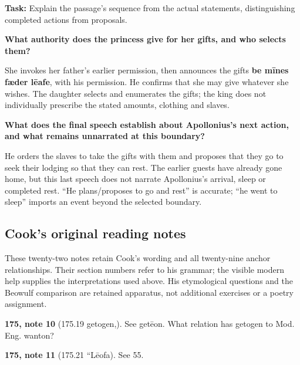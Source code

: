 \textbf{Task:} Explain the passage’s sequence from the actual statements, distinguishing completed actions from proposals.

\textbf{What authority does the princess give for her gifts, and who selects them?}

She invokes her father’s earlier permission, then announces the gifts \textbf{be mīnes fæder lēafe}, with his permission. He confirms that she may give whatever she wishes. The daughter selects and enumerates the gifts; the king does not individually prescribe the stated amounts, clothing and slaves.

\textbf{What does the final speech establish about Apollonius’s next action, and what remains unnarrated at this boundary?}

He orders the slaves to take the gifts with them and proposes that they go to seek their lodging so that they can rest. The earlier guests have already gone home, but this last speech does not narrate Apollonius’s arrival, sleep or completed rest. “He plans/\allowbreak{}proposes to go and rest” is accurate; “he went to sleep” imports an event beyond the selected boundary.

\subsection*{Cook’s original reading notes}

These twenty-two notes retain Cook’s wording and all twenty-nine anchor relationships. Their section numbers refer to his grammar; the visible modern help supplies the interpretations used above. His etymological questions and the Beowulf comparison are retained apparatus, not additional exercises or a poetry assignment.

\textbf{175, note 10} (175.19 getogen,). See getēon. What relation has getogen to Mod. Eng. wanton?

\textbf{175, note 11} (175.21 “Lēofa). See 55.

